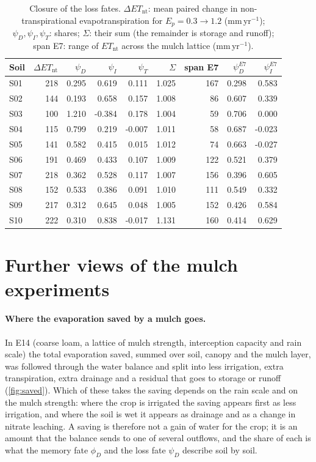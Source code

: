 \documentclass[preprint,12pt,authoryear]{elsarticle}
\newcommand{\Ent}{\mathit{ET}_{\mathrm{nt}}}
\begin{document}
\begin{table}[H]\centering\small
\caption{Closure of the loss fates. $\Delta\Ent$: mean paired change in non-transpirational evapotranspiration for $E_p=0.3\to1.2$ (mm\,yr$^{-1}$); $\psi_D,\psi_I,\psi_T$: shares; $\Sigma$: their sum (the remainder is storage and runoff); span E7: range of $\Ent$ across the mulch lattice (mm\,yr$^{-1}$).}
\label{tab:closure}
\begin{tabular}{lrrrrrrrr}
\toprule
Soil & $\Delta\Ent$ & $\psi_D$ & $\psi_I$ & $\psi_T$ & $\Sigma$ & span E7 & $\psi_D^{E7}$ & $\psi_I^{E7}$\\\midrule
S01 & 218 & 0.295 & 0.619 & 0.111 & 1.025 & 167 & 0.298 & 0.583\\
S02 & 144 & 0.193 & 0.658 & 0.157 & 1.008 & 86 & 0.607 & 0.339\\
S03 & 100 & 1.210 & -0.384 & 0.178 & 1.004 & 59 & 0.706 & 0.000\\
S04 & 115 & 0.799 & 0.219 & -0.007 & 1.011 & 58 & 0.687 & -0.023\\
S05 & 141 & 0.582 & 0.415 & 0.015 & 1.012 & 74 & 0.663 & -0.027\\
S06 & 191 & 0.469 & 0.433 & 0.107 & 1.009 & 122 & 0.521 & 0.379\\
S07 & 218 & 0.362 & 0.528 & 0.117 & 1.007 & 156 & 0.396 & 0.605\\
S08 & 152 & 0.533 & 0.386 & 0.091 & 1.010 & 111 & 0.549 & 0.332\\
S09 & 217 & 0.312 & 0.645 & 0.048 & 1.005 & 152 & 0.426 & 0.584\\
S10 & 222 & 0.310 & 0.838 & -0.017 & 1.131 & 160 & 0.414 & 0.629\\
\bottomrule
\end{tabular}
\end{table}

\section{Further views of the mulch experiments}\label{app:mulchviews}
\paragraph{Where the evaporation saved by a mulch goes.}
In E14 (coarse loam, a lattice of mulch strength, interception capacity and rain scale) the total evaporation saved, summed over soil, canopy and the mulch layer, was followed through the water balance and split into less irrigation, extra transpiration, extra drainage and a residual that goes to storage or runoff (\cref{fig:saved}). Which of these takes the saving depends on the rain scale and on the mulch strength: where the crop is irrigated the saving appears first as less irrigation, and where the soil is wet it appears as drainage and as a change in nitrate leaching. A saving is therefore not a gain of water for the crop; it is an amount that the balance sends to one of several outflows, and the share of each is what the memory fate $\phi_D$ and the loss fate $\psi_D$ describe soil by soil.
\end{document}
